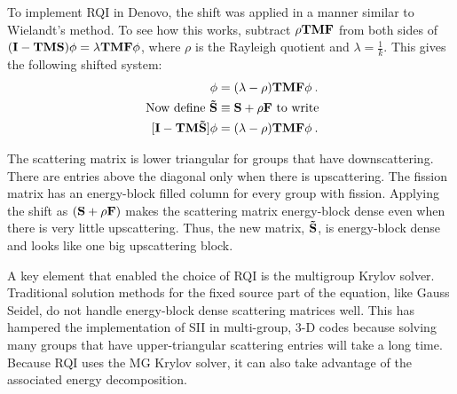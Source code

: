 To implement RQI in Denovo, the shift was applied in a manner similar to Wielandt's method. To see how this works, subtract $\rho \mathbf{TMF}$ from both sides of $(\mathbf{I} - \mathbf{TMS})\phi = \lambda \mathbf{TMF}\phi$, where $\rho$ is the Rayleigh quotient and $\lambda = \frac{1}{k}$. This gives the following shifted system:
%
\begin{align}
  [\ve{I} - \ve{TM}(\ve{S} + \rho\ve{F})]\phi &=( \lambda - \rho) \ve{TMF} \phi \:. \\
  \text{ Now define } \ve{\tilde{S}} &\equiv \ve{S} + \rho\ve{F} \text{ to write} \nonumber \\
   [\ve{I} - \ve{TM\tilde{S}}]\phi &=( \lambda - \rho) \ve{TMF} \phi \:.
    \label{eq:OperatorShiftedEval}
\end{align}

The scattering matrix is lower triangular for groups that have downscattering. There are entries above the diagonal only when there is upscattering. The fission matrix has an energy-block filled column for every group with fission. Applying the shift as $(\mathbf{S} + \rho \mathbf{F})$ makes the scattering matrix energy-block dense even when there is very little upscattering. Thus, the new matrix, $\mathbf{\tilde{S}}$, is energy-block dense and looks like one big upscattering block.

A key element that enabled the choice of RQI is the multigroup Krylov solver. Traditional solution methods for the fixed source part of the equation, like Gauss Seidel, do not handle energy-block dense scattering matrices well. This has hampered the implementation of SII in multi-group, 3-D codes because solving many groups that have upper-triangular scattering entries will take a long time. Because RQI uses the MG Krylov solver, it can also take advantage of the associated energy decomposition. 

